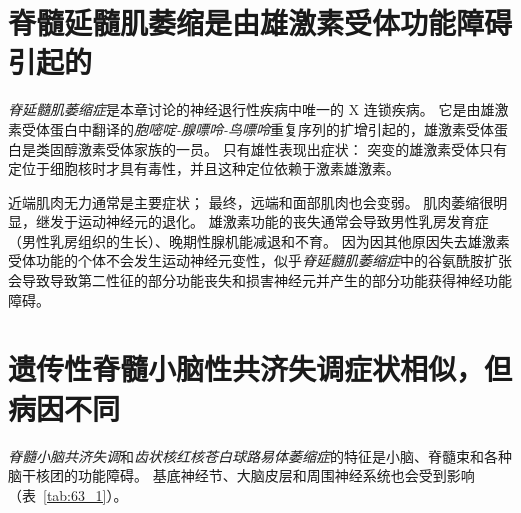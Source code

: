 \section{脊髓延髓肌萎缩是由雄激素受体功能障碍引起的}

\textit{脊延髓肌萎缩症}是本章讨论的神经退行性疾病中唯一的 X 连锁疾病。
它是由雄激素受体蛋白中翻译的\textit{胞嘧啶-腺嘌呤-鸟嘌呤}重复序列的扩增引起的，雄激素受体蛋白是类固醇激素受体家族的一员。
只有雄性表现出症状：
突变的雄激素受体只有定位于细胞核时才具有毒性，并且这种定位依赖于激素雄激素。


近端肌肉无力通常是主要症状；
最终，远端和面部肌肉也会变弱。
肌肉萎缩很明显，继发于运动神经元的退化。
雄激素功能的丧失通常会导致男性乳房发育症（男性乳房组织的生长）、晚期性腺机能减退和不育。
因为因其他原因失去雄激素受体功能的个体不会发生运动神经元变性，似乎\textit{脊延髓肌萎缩症}中的谷氨酰胺扩张会导致导致第二性征的部分功能丧失和损害神经元并产生的部分功能获得神经功能障碍。



\section{遗传性脊髓小脑性共济失调症状相似，但病因不同}

\textit{脊髓小脑共济失调}和\textit{齿状核红核苍白球路易体萎缩症}的特征是小脑、脊髓束和各种脑干核团的功能障碍。
基底神经节、大脑皮层和周围神经系统也会受到影响（表~\ref{tab:63_1}）。


